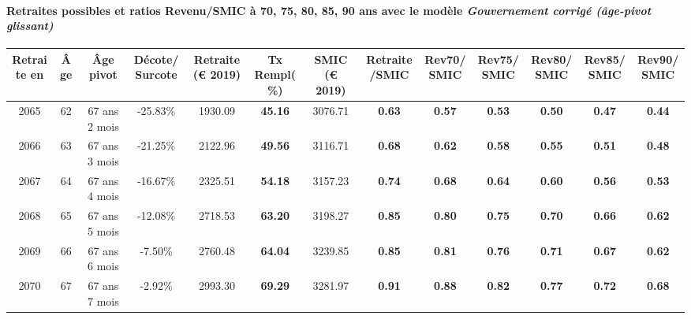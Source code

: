 \paragraph{Retraites possibles et ratios Revenu/SMIC à 70, 75, 80, 85, 90 ans avec le modèle \emph{Gouvernement corrigé (âge-pivot glissant)}}  
 
{ \scriptsize \begin{center} 
\begin{tabular}[htb]{|c|c||c|c||c|c||c||c|c|c|c|c|c|} 
\hline 
 Retraite en &  Âge &  Âge pivot &  Décote/Surcote &  Retraite (\euro{} 2019) &  Tx Rempl(\%) &  SMIC (\euro{} 2019) &  Retraite/SMIC &  Rev70/SMIC &  Rev75/SMIC &  Rev80/SMIC &  Rev85/SMIC &  Rev90/SMIC \\ 
\hline \hline 
 2065 &  62 &  67 ans 2 mois &  -25.83\% &  1930.09 &  {\bf 45.16} &  3076.71 &  {\bf {\color{red} 0.63}} &  {\bf {\color{red} 0.57}} &  {\bf {\color{red} 0.53}} &  {\bf {\color{red} 0.50}} &  {\bf {\color{red} 0.47}} &  {\bf {\color{red} 0.44}} \\ 
\hline 
 2066 &  63 &  67 ans 3 mois &  -21.25\% &  2122.96 &  {\bf 49.56} &  3116.71 &  {\bf {\color{red} 0.68}} &  {\bf {\color{red} 0.62}} &  {\bf {\color{red} 0.58}} &  {\bf {\color{red} 0.55}} &  {\bf {\color{red} 0.51}} &  {\bf {\color{red} 0.48}} \\ 
\hline 
 2067 &  64 &  67 ans 4 mois &  -16.67\% &  2325.51 &  {\bf 54.18} &  3157.23 &  {\bf {\color{red} 0.74}} &  {\bf {\color{red} 0.68}} &  {\bf {\color{red} 0.64}} &  {\bf {\color{red} 0.60}} &  {\bf {\color{red} 0.56}} &  {\bf {\color{red} 0.53}} \\ 
\hline 
 2068 &  65 &  67 ans 5 mois &  -12.08\% &  2718.53 &  {\bf 63.20} &  3198.27 &  {\bf {\color{red} 0.85}} &  {\bf {\color{red} 0.80}} &  {\bf {\color{red} 0.75}} &  {\bf {\color{red} 0.70}} &  {\bf {\color{red} 0.66}} &  {\bf {\color{red} 0.62}} \\ 
\hline 
 2069 &  66 &  67 ans 6 mois &  -7.50\% &  2760.48 &  {\bf 64.04} &  3239.85 &  {\bf {\color{red} 0.85}} &  {\bf {\color{red} 0.81}} &  {\bf {\color{red} 0.76}} &  {\bf {\color{red} 0.71}} &  {\bf {\color{red} 0.67}} &  {\bf {\color{red} 0.62}} \\ 
\hline 
 2070 &  67 &  67 ans 7 mois &  -2.92\% &  2993.30 &  {\bf 69.29} &  3281.97 &  {\bf {\color{red} 0.91}} &  {\bf {\color{red} 0.88}} &  {\bf {\color{red} 0.82}} &  {\bf {\color{red} 0.77}} &  {\bf {\color{red} 0.72}} &  {\bf {\color{red} 0.68}} \\ 
\hline 
\hline 
\end{tabular} 
\end{center} } 
